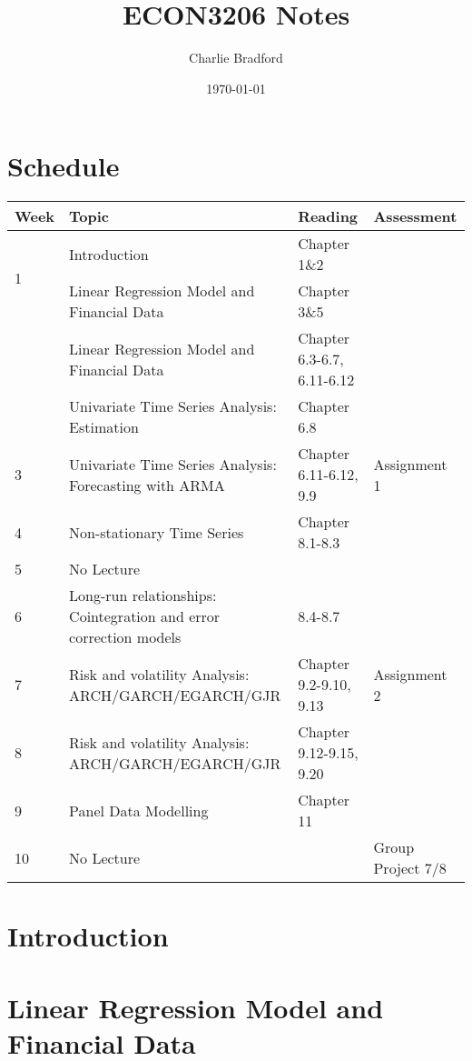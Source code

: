 \documentclass[a4paper]{article}
\title{ECON3206 Notes}
\author{Charlie Bradford}
\date{\today}
\begin{document}
\maketitle
\tableofcontents

\section*{Schedule}
\begin{center}
\begin{tabularx}{0.8\textwidth}{XXXX}
\toprule\toprule
\textbf{Week} & \textbf{Topic} & \textbf{Reading} & \textbf{Assessment} \\\midrule
\multirow{2}{*}{1} & Introduction & Chapter 1\&{}2 & \\\cmidrule{2-4}
\addlinespace
& Linear Regression Model and Financial Data & Chapter 3\&{}5 &\\
\addlinespace\midrule
\multirow{2}{*}{2} & Linear Regression Model and Financial Data & Chapter 6.3-6.7, 6.11-6.12 &\\\cmidrule{2-4}
& Univariate Time Series Analysis: Estimation & Chapter 6.8 \\\midrule
3 & Univariate Time Series Analysis: Forecasting with ARMA & Chapter 6.11-6.12, 9.9 & Assignment 1 \\\midrule
4 & Non-stationary Time Series & Chapter 8.1-8.3 & \\\midrule
5 & No Lecture & & \\\midrule
6 & Long-run relationships: Cointegration and error correction models & 8.4-8.7 & \\\midrule
7 &  Risk and volatility Analysis: ARCH/GARCH/EGARCH/GJR & Chapter 9.2-9.10, 9.13 & Assignment 2 \\\midrule
8 & Risk and volatility Analysis: ARCH/GARCH/EGARCH/GJR & Chapter 9.12-9.15, 9.20 & \\\midrule
9 & Panel Data Modelling & Chapter 11 & \\\midrule
10 & No Lecture & & Group Project 7/8 \\\bottomrule
\end{tabularx}
\end{center}

\section{Introduction}

\section{Linear Regression Model and Financial Data}
\end{document}
